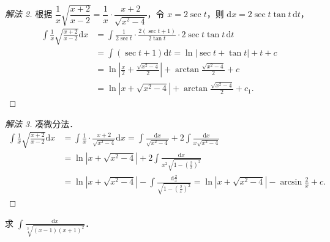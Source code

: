 \begin{proof}[解法 2]
根据 $\dfrac{1}{x}\sqrt{\dfrac{x+2}{x-2}} = \dfrac{1}{x}\cdot\dfrac{x+2}{\sqrt{x^{2}-4}}$，令 $x = 2\sec t$，则 $\mathrm{d}x = 2\sec t\tan t\,\mathrm{d}t$，
\[
\begin{aligned}
\int\frac{1}{x}\sqrt{\frac{x+2}{x-2}}\mathrm{d}x
&= \int\frac{1}{2\sec t}\cdot\frac{2(\sec t+1)}{2\tan t}\cdot 2\sec t\tan t\,\mathrm{d}t\\
&= \int(\sec t+1)\mathrm{d}t
= \ln|\sec t+\tan t|+t+c\\
&= \ln\left|\frac{x}{2}+\frac{\sqrt{x^{2}-4}}{2}\right|+\arctan\frac{\sqrt{x^{2}-4}}{2}+c\\
&= \ln\left|x+\sqrt{x^{2}-4}\right|+\arctan\frac{\sqrt{x^{2}-4}}{2}+c_{1}.
\end{aligned}
\]
\end{proof}

\begin{proof}[解法 3]
凑微分法．
\[
\begin{aligned}
\int\frac{1}{x}\sqrt{\frac{x+2}{x-2}}\mathrm{d}x
&= \int\frac{1}{x}\cdot\frac{x+2}{\sqrt{x^{2}-4}}\mathrm{d}x
= \int\frac{\mathrm{d}x}{\sqrt{x^{2}-4}}+2\int\frac{\mathrm{d}x}{x\sqrt{x^{2}-4}}\\
&= \ln\left|x+\sqrt{x^{2}-4}\right|+2\int\frac{\mathrm{d}x}{x^{2}\sqrt{1-\left(\frac{2}{x}\right)^{2}}}\\
&= \ln\left|x+\sqrt{x^{2}-4}\right|-\int\frac{\mathrm{d}\frac{2}{x}}{\sqrt{1-\left(\frac{2}{x}\right)^{2}}}
= \ln\left|x+\sqrt{x^{2}-4}\right|-\arcsin\frac{2}{x}+c.
\end{aligned}
\]
\end{proof}

\begin{example}\label{ex:6-2-31}
求 $\displaystyle\int\frac{\mathrm{d}x}{\sqrt[3]{(x-1)(x+1)^{2}}}$．
\end{example}

